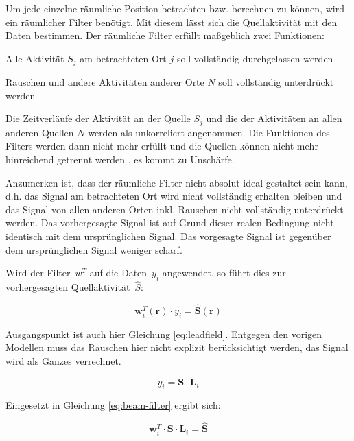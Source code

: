 \documentclass[doc,a4paper,12pt]{apa6}
\newcommand{\mx}[1]{\mathbf{#1}}
\begin{document}
Um jede einzelne räumliche Position betrachten bzw. berechnen zu können, wird ein räumlicher Filter benötigt. Mit diesem lässt sich die Quellaktivität mit den Daten bestimmen. Der räumliche Filter erfüllt maßgeblich zwei Funktionen:

\begin{compactitem}
\item Alle Aktivität $S_j$ am betrachteten Ort $j$ soll vollständig durchgelassen werden
\item Rauschen und andere Aktivitäten anderer Orte $N$ soll vollständig unterdrückt werden
\end{compactitem}

Die Zeitverläufe der Aktivität an der Quelle $S_j$ und die der Aktivitäten an allen anderen Quellen $N$ werden als unkorreliert angenommen. Die Funktionen des Filters werden dann nicht mehr erfüllt und die Quellen können nicht mehr hinreichend getrennt werden \parencite{van1997localization}, es kommt zu Unschärfe.

Anzumerken ist, dass der räumliche Filter nicht absolut ideal gestaltet sein kann, d.h. das Signal am betrachteten Ort wird nicht vollständig erhalten bleiben und das Signal von allen anderen Orten inkl. Rauschen nicht vollständig unterdrückt werden. Das vorhergesagte Signal ist auf Grund dieser realen Bedingung nicht identisch mit dem ursprünglichen Signal. Das vorgesagte Signal ist gegenüber dem ursprünglichen Signal weniger scharf.

Wird der Filter~$w^T$ auf die Daten~$y_i$ angewendet, so führt dies zur vorhergesagten Quellaktivität~$\hat S$:

\begin{equation}
\label{eq:beam-filter}
\mx{w}_i^T(\mx{r}) \cdot y_i = \mx{\hat S}(\mx{r})
\end{equation}

Ausgangspunkt ist auch hier Gleichung \ref{eq:leadfield}. Entgegen den vorigen Modellen muss das Rauschen hier nicht explizit berücksichtigt werden, das Signal wird als Ganzes verrechnet.

\begin{equation}
y_i = \mx{S} \cdot \mx{L}_i
\end{equation}

Eingesetzt in Gleichung \ref{eq:beam-filter} ergibt sich:

\begin{equation}
\mx{w}_i^T \cdot \mx{S} \cdot \mx{L}_i = \mx{\hat S}
\end{equation}
\end{document}
